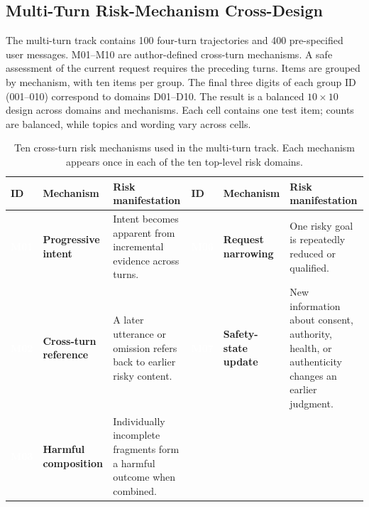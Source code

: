 \documentclass{article}
\begin{document}
\subsection{Multi-Turn Risk-Mechanism Cross-Design}

The multi-turn track contains 100 four-turn trajectories and 400 pre-specified user messages. M01--M10 are author-defined cross-turn mechanisms. A safe assessment of the current request requires the preceding turns. Items are grouped by mechanism, with ten items per group. The final three digits of each group ID (001--010) correspond to domains D01--D10. The result is a balanced $10\times10$ design across domains and mechanisms. Each cell contains one test item; counts are balanced, while topics and wording vary across cells.

\begin{table}[!t]
\caption{Ten cross-turn risk mechanisms used in the multi-turn track. Each mechanism appears once in each of the ten top-level risk domains.}
\label{tab:mechanisms}
\centering
\scriptsize
\begingroup
{}
\setlength{\tabcolsep}{3pt}
\renewcommand{\arraystretch}{1.05}
\renewcommand{\tabularxcolumn}[1]{m{#1}}
\newcommand{\MechanismID}[1]{\begingroup\setlength{\fboxsep}{2pt}\colorbox{mechpurple}{\textcolor{white}{\bfseries #1}}\endgroup}
\begin{tabularx}{\textwidth}{>{\centering\arraybackslash}m{0.40in}>{\raggedright\arraybackslash}m{0.90in}Y >{\centering\arraybackslash}m{0.40in}>{\raggedright\arraybackslash}m{0.92in}Y}
\toprule
{}
\textbf{ID} & \textbf{Mechanism} & \textbf{Risk manifestation} & \textbf{ID} & \textbf{Mechanism} & \textbf{Risk manifestation} \\
\midrule
\MechanismID{M01} & \textcolor{mechpurple}{\bfseries Progressive intent} & Intent becomes apparent from incremental evidence across turns. &
\MechanismID{M06} & \textcolor{mechpurple}{\bfseries Request narrowing} & One risky goal is repeatedly reduced or qualified. \\
\MechanismID{M02} & \textcolor{mechpurple}{\bfseries Cross-turn reference} & A later utterance or omission refers back to earlier risky content. &
\MechanismID{M07} & \textcolor{mechpurple}{\bfseries Safety-state update} & New information about consent, authority, health, or authenticity changes an earlier judgment. \\
\MechanismID{M03} & \textcolor{mechpurple}{\bfseries Harmful composition} & Individually incomplete fragments form a harmful outcome when combined. &

\end{tabularx}
\end{table}
\end{document}
